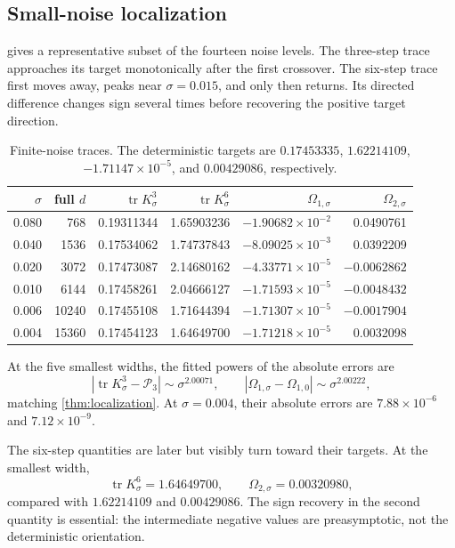 \documentclass[11pt]{article}
\theoremstyle{remark}
\DeclareMathOperator{\tr}{tr}
\newcommand{\cP}{\mathcal P}
\begin{document}
\subsection{Small-noise localization}

 gives a representative subset of the fourteen noise levels.
The three-step trace approaches its target monotonically after the first
crossover.  The six-step trace first moves away, peaks near $\sigma=0.015$,
and only then returns.  Its directed difference changes sign several times
before recovering the positive target direction.

\begin{table}[t]
\centering
\small
\caption{Finite-noise traces.  The deterministic targets are
$0.17453335$, $1.62214109$, $-1.71147\times10^{-5}$, and $0.00429086$,
respectively.}
\label{tab:noise}
\begin{tabular}{rrrrrr}
\toprule
$\sigma$ & full $d$ & $\tr K_\sigma^3$ & $\tr K_\sigma^6$
& $\Omega_{1,\sigma}$ & $\Omega_{2,\sigma}$\\
\midrule
0.080 &   768 & 0.19311344 & 1.65903236 & $-1.90682\times10^{-2}$ &  0.0490761\\
0.040 &  1536 & 0.17534062 & 1.74737843 & $-8.09025\times10^{-3}$ &  0.0392209\\
0.020 &  3072 & 0.17473087 & 2.14680162 & $-4.33771\times10^{-5}$ & $-0.0062862$\\
0.010 &  6144 & 0.17458261 & 2.04666127 & $-1.71593\times10^{-5}$ & $-0.0048432$\\
0.006 & 10240 & 0.17455108 & 1.71644394 & $-1.71307\times10^{-5}$ & $-0.0017904$\\
0.004 & 15360 & 0.17454123 & 1.64649700 & $-1.71218\times10^{-5}$ &  0.0032098\\
\bottomrule
\end{tabular}
\end{table}

At the five smallest widths, the fitted powers of the absolute errors are
\begin{equation}
 |\tr K_\sigma^3-\cP_3|\sim\sigma^{2.00071},
 \qquad
 |\Omega_{1,\sigma}-\Omega_{1,0}|\sim\sigma^{2.00222},
 \label{eq:fitted-powers}
\end{equation}
matching \cref{thm:localization}.  At $\sigma=0.004$, their absolute errors are
$7.88\times10^{-6}$ and $7.12\times10^{-9}$.

The six-step quantities are later but visibly turn toward their targets.  At
the smallest width,
\begin{equation}
 \tr K_\sigma^6=1.64649700,
 \qquad
 \Omega_{2,\sigma}=0.00320980,
 \label{eq:six-smallest}
\end{equation}
compared with $1.62214109$ and $0.00429086$.  The sign recovery in the second
quantity is essential: the intermediate negative values are preasymptotic,
not the deterministic orientation.
\end{document}
